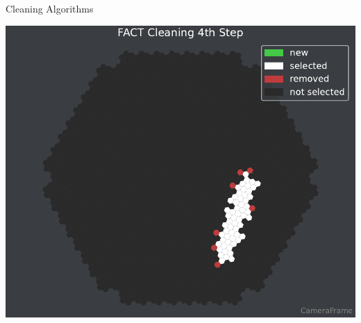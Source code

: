 \begin{frame}[t]{Cleaning Algorithms}
{\begin{overlayarea}{0.36\textwidth}{3.5cm}
{        \includegraphics[width=\textwidth]{plots/cleaner_steps/dark/fact_4.pdf}
      }
\end{overlayarea}}
\end{frame}

